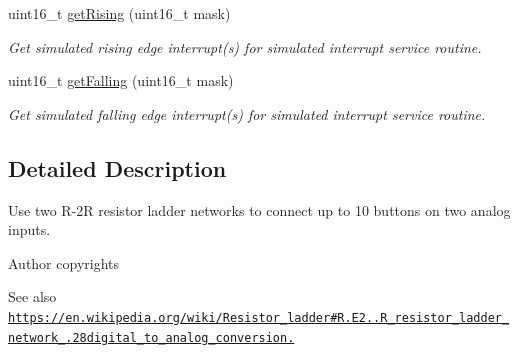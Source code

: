 \begin{DoxyCompactItemize}
uint16\+\_\+t \hyperlink{group__buttons_ga9b1decfe9116af4b8853a02aebfa1d14}{get\+Rising} (uint16\+\_\+t mask)
\begin{DoxyCompactList}\small\item\em Get simulated rising edge interrupt(s) for simulated interrupt service routine. \end{DoxyCompactList}\item 
uint16\+\_\+t \hyperlink{group__buttons_ga2971d62e0d7420f71836fb86e0fce92f}{get\+Falling} (uint16\+\_\+t mask)
\begin{DoxyCompactList}\small\item\em Get simulated falling edge interrupt(s) for simulated interrupt service routine. \end{DoxyCompactList}\end{DoxyCompactItemize}


\subsection{Detailed Description}
Use two R-\/2R resistor ladder networks to connect up to 10 buttons on two analog inputs. 

\begin{DoxyAuthor}{Author}
copyrights
\end{DoxyAuthor}
\begin{DoxySeeAlso}{See also}
\href{https://en.wikipedia.org/wiki/Resistor_ladder#R.E2.80.932R_resistor_ladder_network_.28digital_to_analog_conversion.29}{\tt https\+://en.\+wikipedia.\+org/wiki/\+Resistor\+\_\+ladder\#\+R.\+E2..\+R\+\_\+resistor\+\_\+ladder\+\_\+network\+\_\+.\+28digital\+\_\+to\+\_\+analog\+\_\+conversion.} 
\end{DoxySeeAlso}
